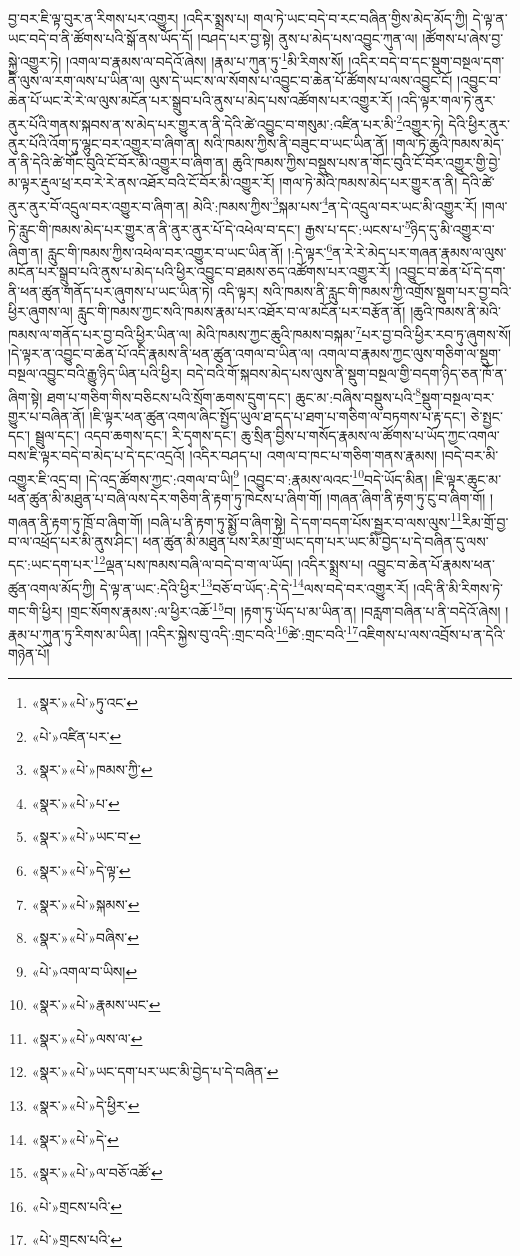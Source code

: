 བྱ་བར་ཇི་ལྟ་བུར་ན་རིགས་པར་འགྱུར། །འདིར་སྨྲས་པ། གལ་ཏེ་ཡང་བདེ་བ་རང་བཞིན་གྱིས་མེད་མོད་ཀྱི། དེ་ལྟ་ན་ཡང་བདེ་བ་ནི་ཚོགས་པའི་སྒོ་ནས་ཡོད་དོ། །བཤད་པར་བྱ་སྟེ། ནུས་པ་མེད་པས་འབྱུང་ཀུན་ལ། །ཚོགས་པ་ཞེས་བྱ་སྐྱེ་འགྱུར་ཏེ། །འགལ་བ་རྣམས་ལ་བདེའོ་ཞེས། །རྣམ་པ་ཀུན་ཏུ་\footnote{«སྣར་»«པེ་»ཏུ་འང་}མི་རིགས་སོ། །འདིར་བདེ་བ་དང་སྡུག་བསྔལ་དག་ནི་ལུས་ལ་རག་ལས་པ་ཡིན་ལ། ལུས་དེ་ཡང་ས་ལ་སོགས་པ་འབྱུང་བ་ཆེན་པོ་ཚོགས་པ་ལས་འབྱུང་ངོ། །འབྱུང་བ་ཆེན་པོ་ཡང་རེ་རེ་ལ་ལུས་མངོན་པར་སྒྲུབ་པའི་ནུས་པ་མེད་པས་འཚོགས་པར་འགྱུར་རོ། །འདི་ལྟར་གལ་ཏེ་ནུར་ནུར་པོའི་གནས་སྐབས་ན་ས་མེད་པར་གྱུར་ན་ནི་དེའི་ཚེ་འབྱུང་བ་གསུམ་:འཛིན་པར་མི་\footnote{«པེ་»འཛིན་པར་}འགྱུར་ཏེ། དེའི་ཕྱིར་ནུར་ནུར་པོའི་འོག་ཏུ་ལྷུང་བར་འགྱུར་བ་ཞིག་ན། སའི་ཁམས་ཀྱིས་ནི་བཟུང་བ་ཡང་ཡིན་ནོ། །གལ་ཏེ་ཆུའི་ཁམས་མེད་ན་ནི་དེའི་ཚེ་གོང་བུའི་ངོ་བོར་མི་འགྱུར་བ་ཞིག་ན། ཆུའི་ཁམས་ཀྱིས་བསྡུས་པས་ན་གོང་བུའི་ངོ་བོར་འགྱུར་གྱི་བྱེ་མ་ལྟར་རྡུལ་ཕྲ་རབ་རེ་རེ་ནས་འཐོར་བའི་ངོ་བོར་མི་འགྱུར་རོ། །གལ་ཏེ་མེའི་ཁམས་མེད་པར་གྱུར་ན་ནི། དེའི་ཚེ་ནུར་ནུར་བོ་འདྲུལ་བར་འགྱུར་བ་ཞིག་ན། མེའི་:ཁམས་ཀྱིས་\footnote{«སྣར་»«པེ་»ཁམས་ཀྱི་}སྐམ་པས་\footnote{«སྣར་»«པེ་»པ་}ན་དེ་འདྲུལ་བར་ཡང་མི་འགྱུར་རོ། །གལ་ཏེ་རླུང་གི་ཁམས་མེད་པར་གྱུར་ན་ནི་ནུར་ནུར་པོ་དེ་འཕེལ་བ་དང་། རྒྱས་པ་དང་:ཡངས་པ་\footnote{«སྣར་»«པེ་»ཡང་བ་}ཉིད་དུ་མི་འགྱུར་བ་ཞིག་ན། རླུང་གི་ཁམས་ཀྱིས་འཕེལ་བར་འགྱུར་བ་ཡང་ཡིན་ནོ། །:དེ་ལྟར་\footnote{«སྣར་»«པེ་»དེ་ལྟ་}ན་རེ་རེ་མེད་པར་གཞན་རྣམས་ལ་ལུས་མངོན་པར་སྒྲུབ་པའི་ནུས་པ་མེད་པའི་ཕྱིར་འབྱུང་བ་ཐམས་ཅད་འཚོགས་པར་འགྱུར་རོ། །འབྱུང་བ་ཆེན་པོ་དེ་དག་ནི་ཕན་ཚུན་གནོད་པར་ཞུགས་པ་ཡང་ཡིན་ཏེ། འདི་ལྟར། སའི་ཁམས་ནི་རླུང་གི་ཁམས་ཀྱི་འགྲོས་སྡུག་པར་བྱ་བའི་ཕྱིར་ཞུགས་ལ། རླུང་གི་ཁམས་ཀྱང་སའི་ཁམས་རྣམ་པར་འཐོར་བ་ལ་མངོན་པར་བརྩོན་ནོ། །ཆུའི་ཁམས་ནི་མེའི་ཁམས་ལ་གནོད་པར་བྱ་བའི་ཕྱིར་ཡིན་ལ། མེའི་ཁམས་ཀྱང་ཆུའི་ཁམས་བསྐམ་\footnote{«སྣར་»«པེ་»སྐམས་}པར་བྱ་བའི་ཕྱིར་རབ་ཏུ་ཞུགས་སོ། །དེ་ལྟར་ན་འབྱུང་བ་ཆེན་པོ་འདི་རྣམས་ནི་ཕན་ཚུན་འགལ་བ་ཡིན་ལ། འགལ་བ་རྣམས་ཀྱང་ལུས་གཅིག་ལ་སྡུག་བསྔལ་འབྱུང་བའི་རྒྱུ་ཉིད་ཡིན་པའི་ཕྱིར། བདེ་བའི་གོ་སྐབས་མེད་པས་ལུས་ནི་སྡུག་བསྔལ་གྱི་བདག་ཉིད་ཅན་ཁོ་ན་ཞིག་སྟེ། ཐག་པ་གཅིག་གིས་བཅིངས་པའི་སྲོག་ཆགས་དྲུག་དང་། ཆུང་མ་:བཞིས་བསྡུས་པའི་\footnote{«སྣར་»«པེ་»བཞིས་}སྡུག་བསྔལ་བར་གྱུར་པ་བཞིན་ནོ། །ཇི་ལྟར་ཕན་ཚུན་འགལ་ཞིང་སྤྱོད་ཡུལ་ཐ་དད་པ་ཐག་པ་གཅིག་ལ་བཏགས་པ་རྟ་དང་། ཅེ་སྤྱང་དང་། སྦྲུལ་དང་། འདབ་ཆགས་དང་། རི་དྭགས་དང་། ཆུ་སྲིན་བྱིས་པ་གསོད་རྣམས་ལ་ཚོགས་པ་ཡོད་ཀྱང་འགལ་བས་ཇི་ལྟར་བདེ་བ་མེད་པ་དེ་དང་འདྲའོ། །འདིར་བཤད་པ། འགལ་བ་ཁང་པ་གཅིག་གནས་རྣམས། །བདེ་བར་མི་འགྱུར་ཇི་འདྲ་བ། །དེ་འདྲ་ཚོགས་ཀྱང་:འགལ་བ་ཡི།\footnote{«པེ་»འགལ་བ་ཡིས།} །འབྱུང་བ་:རྣམས་ལའང་\footnote{«སྣར་»«པེ་»རྣམས་ཡང་}བདེ་ཡོད་མིན། །ཇི་ལྟར་ཆུང་མ་ཕན་ཚུན་མི་མཐུན་པ་བཞི་ལས་དེར་གཅིག་ནི་རྟག་ཏུ་ཁེངས་པ་ཞིག་གོ། །གཞན་ཞིག་ནི་རྟག་ཏུ་ངུ་བ་ཞིག་གོ། །གཞན་ནི་རྟག་ཏུ་ཁྲོ་བ་ཞིག་གོ། །བཞི་པ་ནི་རྟག་ཏུ་སྨྱོ་བ་ཞིག་སྟེ། དེ་དག་བདག་པོས་སྦྱར་བ་ལས་ལུས་\footnote{«སྣར་»«པེ་»ལས་ལ་}རིམ་གྲོ་བྱ་བ་ལ་འཕྲོད་པར་མི་ནུས་ཤིང་། ཕན་ཚུན་མི་མཐུན་པས་རིམ་གྲོ་ཡང་དག་པར་ཡང་མི་བྱེད་པ་དེ་བཞིན་དུ་ལས་དང་:ཡང་དག་པར་\footnote{«སྣར་»«པེ་»ཡང་དག་པར་ཡང་མི་བྱེད་པ་དེ་བཞིན་}ལྡན་པས་ཁམས་བཞི་ལ་བདེ་བ་ག་ལ་ཡོད། །འདིར་སྨྲས་པ། འབྱུང་བ་ཆེན་པོ་རྣམས་ཕན་ཚུན་འགལ་མོད་ཀྱི། དེ་ལྟ་ན་ཡང་:དེའི་ཕྱིར་\footnote{«སྣར་»«པེ་»དེ་ཕྱིར་}བཅོ་བ་ཡོད་:དེ་དེ་\footnote{«སྣར་»«པེ་»དེ་}ལས་བདེ་བར་འགྱུར་རོ། །འདི་ནི་མི་རིགས་ཏེ་གང་གི་ཕྱིར། །གྲང་སོགས་རྣམས་:ལ་ཕྱིར་འཆོ་\footnote{«སྣར་»«པེ་»ལ་བཅོ་འཚོ་}བ། །རྟག་ཏུ་ཡོད་པ་མ་ཡིན་ན། །བརླག་བཞིན་པ་ནི་བདེའོ་ཞེས། །རྣམ་པ་ཀུན་ཏུ་རིགས་མ་ཡིན། །འདིར་སྐྱེས་བུ་འདི་:གྲང་བའི་\footnote{«པེ་»གྲངས་པའི་}ཚེ་:གྲང་བའི་\footnote{«པེ་»གྲངས་པའི་}འཇིགས་པ་ལས་འབྲོས་པ་ན་དེའི་གཉེན་པོ། 